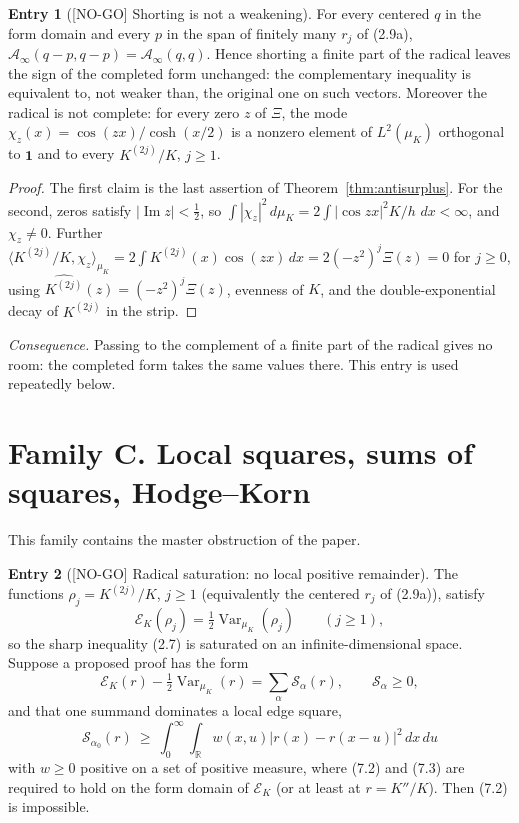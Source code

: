 \documentclass[11pt]{amsart}
\theoremstyle{definition}
\newcounter{family}
\newtheorem{entry}{Entry}[family]
\theoremstyle{remark}
\newcommand{\R}{\mathbb R}
\newcommand{\dd}{\,d}
\newcommand{\XiR}{\Xi}
\newcommand{\EK}{\mathscr E_K}
\DeclareMathOperator{\Var}{Var}
\newcommand{\NOGO}{\textup{[NO-GO]}}
\begin{document}
\begin{entry}[\NOGO{} Shorting is not a weakening]
\label{ent:B3}
For every centered \(q\) in the form domain and every \(p\) in the span
of finitely many \(r_j\) of (2.9a),
\(\mathcal A_\infty(q-p,q-p)=\mathcal A_\infty(q,q)\).  Hence shorting a
finite part of the radical leaves the sign of the completed form
unchanged: the complementary inequality is equivalent to, not weaker
than, the original one on such vectors.  Moreover the radical is not
complete: for every zero \(z\) of \(\XiR\), the mode
\(\chi_z(x)=\cos(zx)/\cosh(x/2)\) is a nonzero element of
\(L^2(\mu_K)\) orthogonal to \(\mathbf 1\) and to every \(K^{(2j)}/K\),
\(j\ge1\).
\end{entry}

\begin{proof}
The first claim is the last assertion of Theorem~\ref{thm:antisurplus}.
For the second, zeros satisfy \(|\operatorname{Im}z|<\frac12\), so
\(\int|\chi_z|^2\dd\mu_K=2\int|\cos zx|^2K/h\,\dd x<\infty\), and
\(\chi_z\ne0\).  Further
\(\langle K^{(2j)}/K,\chi_z\rangle_{\mu_K}
=2\int K^{(2j)}(x)\cos(zx)\dd x=2(-z^2)^j\XiR(z)=0\) for \(j\ge0\), using
\(\widehat{K^{(2j)}}(z)=(-z^2)^j\XiR(z)\), evenness of \(K\), and the
double-exponential decay of \(K^{(2j)}\) in the strip.
\end{proof}

\emph{Consequence.} Passing to the complement of a finite part of the
radical gives no room: the completed form takes the same values there.
This entry is used repeatedly below.

\section{Family C. Local squares, sums of squares, Hodge--Korn}

This family contains the master obstruction of the paper.

\begin{entry}[\NOGO{} Radical saturation: no local positive remainder]
\label{ent:C1}
The functions \(\rho_j=K^{(2j)}/K\), \(j\ge1\) (equivalently the centered
\(r_j\) of (2.9a)), satisfy
\[
 \EK(\rho_j)=\tfrac12\Var_{\mu_K}(\rho_j)\qquad(j\ge1),
\tag{7.1}
\]
so the sharp inequality (2.7) is saturated on an infinite-dimensional
space.  Suppose a proposed proof has the form
\[
 \EK(r)-\tfrac12\Var_{\mu_K}(r)=\sum_\alpha\mathcal S_\alpha(r),
 \qquad \mathcal S_\alpha\ge0,
\tag{7.2}
\]
and that one summand dominates a local edge square,
\[
 \mathcal S_{\alpha_0}(r)\ \ge\
 \int_0^\infty\!\!\int_\R w(x,u)|r(x)-r(x-u)|^2\dd x\dd u
\tag{7.3}
\]
with \(w\ge0\) positive on a set of positive measure, where (7.2) and
(7.3) are required to hold on the form domain of \(\EK\) (or at least at
\(r=K''/K\)).  Then (7.2) is impossible.
\end{entry}
\end{document}
